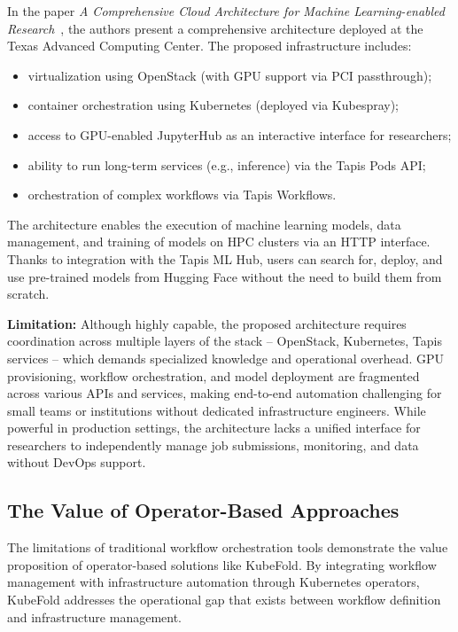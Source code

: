 In the paper \textit{A Comprehensive Cloud Architecture for Machine Learning-enabled Research}~\cite{cloud_architecture_for_research}, the authors present a comprehensive architecture deployed at the Texas Advanced Computing Center.
The proposed infrastructure includes:
\begin{itemize}
    \item virtualization using OpenStack (with GPU support via PCI passthrough);
    \item container orchestration using Kubernetes (deployed via Kubespray);
    \item access to GPU-enabled JupyterHub as an interactive interface for researchers;
    \item ability to run long-term services (e.g., inference) via the Tapis Pods API;
    \item orchestration of complex workflows via Tapis Workflows.
\end{itemize}

The architecture enables the execution of machine learning models, data management, and training of models on HPC clusters via an HTTP interface.
Thanks to integration with the Tapis ML Hub, users can search for, deploy, and use pre-trained models from Hugging Face without the need to build them from scratch.

\textbf{Limitation:} Although highly capable, the proposed architecture requires coordination across multiple layers of the stack -- OpenStack, Kubernetes, Tapis services -- which demands specialized knowledge and operational overhead.
GPU provisioning, workflow orchestration, and model deployment are fragmented across various APIs and services, making end-to-end automation challenging for small teams or institutions without dedicated infrastructure engineers.
While powerful in production settings, the architecture lacks a unified interface for researchers to independently manage job submissions, monitoring, and data without DevOps support.

\subsection{The Value of Operator-Based Approaches}

The limitations of traditional workflow orchestration tools demonstrate the value proposition of operator-based solutions like KubeFold.
By integrating workflow management with infrastructure automation through Kubernetes operators, KubeFold addresses the operational gap that exists between workflow definition and infrastructure management.


